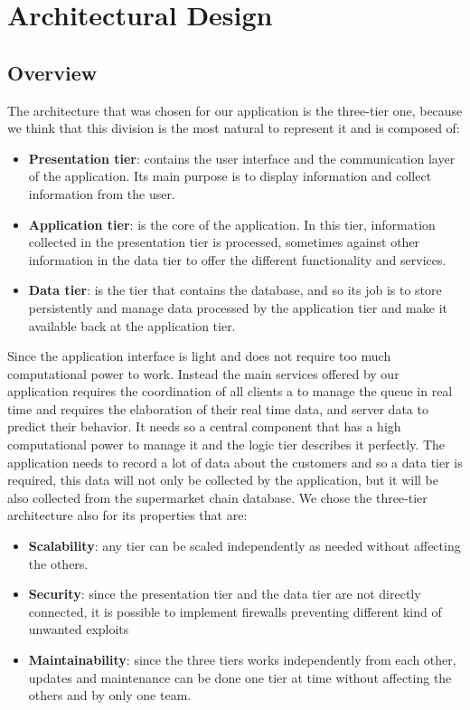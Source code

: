 \chapter{Architectural Design}

\section{Overview}
The architecture that was chosen for our application is the three-tier one, because we think that this division is the most natural to represent it and is composed of: 
\begin{itemize}
	\item \textbf{Presentation tier}: contains the user interface and the communication layer of the application. Its main purpose is to display information and 			collect information from the user.

	\item \textbf{Application tier}: is the core of the application. In this tier, information collected in the presentation tier is processed, sometimes against 			other information in the data tier to offer the different functionality and services.

	\item \textbf{Data tier}: is the tier that contains the database, and so its job is to store persistently and manage data processed by the application tier and 	make it available back at the application tier.
\end{itemize}
Since the application interface is light and does not require too much computational power to work.
Instead the main services offered by our application requires the coordination of all clients a to manage the queue in real time and requires the elaboration of their real time data, and server data to predict their behavior. It needs so a central component that has a high computational power to manage it and the logic tier describes it perfectly. The application needs to record a lot of data about the customers and so a data tier is required, this data will not only be collected by the application, but it will be also collected from the supermarket chain database.
We chose the three-tier architecture also for its properties that are:
\begin{itemize}
	\item \textbf{Scalability}: any tier can be scaled independently as needed without affecting the others.

	\item \textbf{Security}: since the presentation tier and the data tier are not directly connected, it is possible to implement firewalls preventing different 			kind of unwanted exploits

	\item \textbf{Maintainability}: since the three tiers works independently from each other, updates and maintenance can be done one tier at time without 			affecting the others and by only one team. 
\end{itemize}

